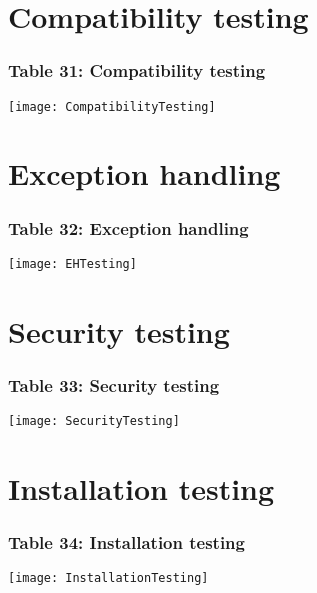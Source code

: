 \begin{figure}
\section{Compatibility testing}
\subsubsection{Table 31: Compatibility testing}
\centering
\texttt{[image: CompatibilityTesting]}
\end{figure}

\begin{figure}
\section{Exception handling}
\subsubsection{Table 32: Exception handling}
\centering
\texttt{[image: EHTesting]}
\end{figure}

\begin{figure}
\section{Security testing}
\subsubsection{Table 33: Security testing}
\centering
\texttt{[image: SecurityTesting]}
\end{figure}

\begin{figure}[t]
\section{Installation testing}
\subsubsection{Table 34: Installation testing}
\centering
\texttt{[image: InstallationTesting]}
\end{figure}


